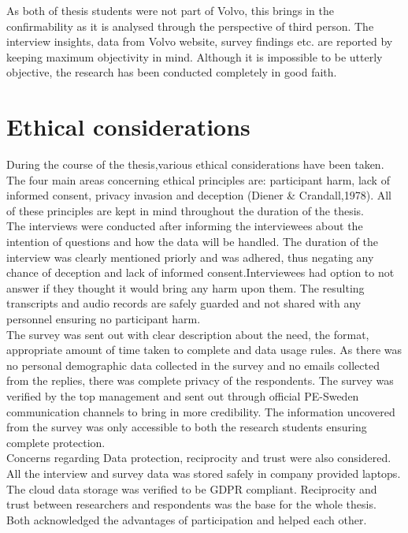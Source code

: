 As both of thesis students were not part of Volvo, this brings in the confirmability as it is analysed through the perspective of third person. The interview insights, data from Volvo website, survey findings etc. are reported by keeping maximum objectivity in mind. Although it is impossible to be utterly objective, the research has been conducted completely in good faith.\\

\section{Ethical considerations}
During the course of the thesis,various ethical considerations have been taken. The  four main areas concerning ethical principles are: participant harm, lack of informed consent, privacy invasion and deception (Diener & Crandall,1978). All of these principles are kept in mind throughout the duration of the thesis.\\

The interviews were conducted after informing the interviewees about the intention of questions and how the data will be handled. The duration of the interview was clearly mentioned priorly and was adhered, thus negating any chance of deception and lack of informed consent.Interviewees had option to not answer if they thought it would bring any harm upon them. The resulting transcripts and audio records are safely guarded and not shared with any personnel ensuring no participant harm.\\


The survey was sent out with clear description about the need, the format, appropriate amount of time taken to complete and data usage rules. As there was no personal demographic data collected in the survey and no emails collected from the replies, there was complete privacy of the respondents. The survey was verified by the top management and sent out through official PE-Sweden communication channels to bring in more credibility. The information uncovered from the survey was only accessible to both the research students ensuring complete protection.\\

Concerns regarding Data protection, reciprocity and trust were also considered. All the interview and survey data was stored safely in company provided laptops. The cloud data storage was verified to be GDPR compliant. Reciprocity and trust between researchers and respondents was the base for the whole thesis. Both acknowledged the advantages of participation and helped each other.\\

